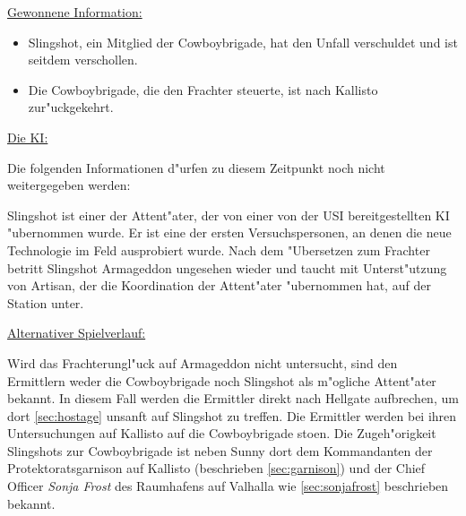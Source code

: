 \begin{remarks}
	\underline{Gewonnene Information:}

	\begin{itemize}
		\item Slingshot, ein Mitglied der Cowboybrigade, hat den Unfall verschuldet und ist seitdem verschollen.
		\item Die Cowboybrigade, die den Frachter steuerte, ist nach Kallisto zur"uckgekehrt.		
	\end{itemize}

	\underline{Die KI:}

	Die folgenden Informationen d"urfen zu diesem Zeitpunkt noch nicht weitergegeben werden:

	Slingshot ist einer der Attent"ater, der von einer von der USI bereitgestellten KI "ubernommen wurde. Er ist eine der ersten Versuchspersonen, an denen die neue Technologie im Feld ausprobiert wurde. Nach dem "Ubersetzen zum Frachter betritt Slingshot Armageddon ungesehen wieder und taucht mit Unterst"utzung von Artisan, der die Koordination der Attent"ater "ubernommen hat, auf der Station unter.

	\underline{Alternativer Spielverlauf:}

	Wird das Frachterungl"uck auf Armageddon nicht untersucht, sind den Ermittlern weder die Cowboybrigade noch Slingshot als m"ogliche Attent"ater bekannt. In diesem Fall werden die Ermittler direkt nach Hellgate aufbrechen, um dort \cref{sec:hostage} unsanft auf Slingshot zu treffen. Die Ermittler werden bei ihren Untersuchungen auf Kallisto auf die Cowboybrigade sto\3en. Die Zugeh"origkeit Slingshots zur Cowboybrigade ist neben Sunny dort dem Kommandanten der Protektoratsgarnison auf Kallisto (beschrieben \cref{sec:garnison}) und der Chief Officer \emph{Sonja Frost} des Raumhafens auf Valhalla wie \cref{sec:sonjafrost} beschrieben bekannt.
\end{remarks}

